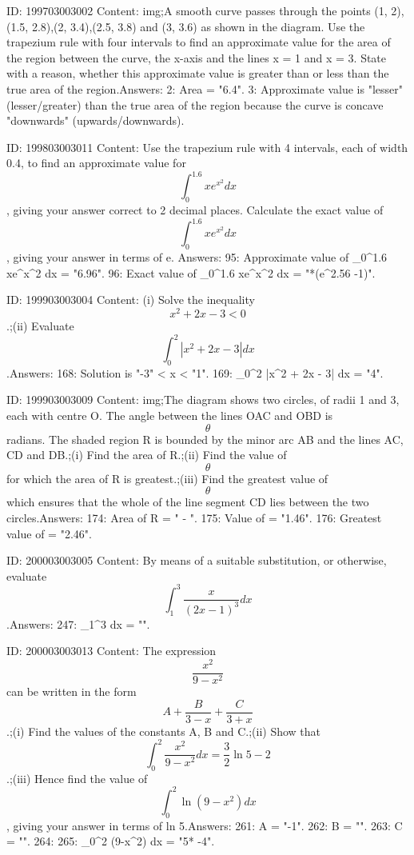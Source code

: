 \documentclass{article}
\begin{document}
ID: 199703003002
Content:
img;A smooth curve passes through the points (1, 2),(1.5, 2.8),(2, 3.4),(2.5, 3.8) and (3, 3.6) as shown in the diagram. Use the trapezium rule with four intervals to find an approximate value for the area of the region between the curve, the x-axis and the lines x = 1 and x = 3. State with a reason, whether this approximate value is greater than or less than the true area of the region.Answers:
2: Area = "6.4".
3: Approximate value is "lesser" (lesser/greater) than the true area of the region because the curve is concave "downwards" (upwards/downwards).

ID: 199803003011
Content:
Use the trapezium rule with 4 intervals, each of width 0.4, to find an approximate value for $$\int^{1.6}_0 x e^{x^2} dx$$, giving your answer correct to 2 decimal places. Calculate the exact value of $$\int^{1.6}_0 x e^{x^2} dx$$, giving your answer in terms of e. Answers:
95: Approximate value of \int_0^1.6 xe^{x^2} dx = "6.96".
96: Exact value of \int_0^1.6 xe^{x^2} dx = "*(e^{2.56} -1)".

ID: 199903003004
Content:
(i) Solve the inequality \[x^2 + 2x - 3 < 0\].;(ii) Evaluate \[\int_{0}^{2} |x^2 + 2x - 3| dx\].Answers:
168: Solution is "-3" < x < "1".
169: \int_0^2 |x^2 + 2x - 3| dx = "4".

ID: 199903003009
Content:
img;The diagram shows two circles, of radii 1 and 3, each with centre O. The angle between the lines OAC and OBD is \[\theta\] radians. The shaded region R is bounded by the minor arc AB and the lines AC, CD and DB.;(i) Find the area of R.;(ii) Find the value of \[\theta\] for which the area of R is greatest.;(iii) Find the greatest value of \[\theta\] which ensures that the whole of the line segment CD lies between the two circles.Answers:
174: Area of R = " \sin{\theta} - \theta".
175: Value of \theta = "1.46".
176: Greatest value of \theta = "2.46".

ID: 200003003005
Content:
By means of a suitable substitution, or otherwise, evaluate \[\int_{1}^{3} \frac{x}{(2x-1)^3} dx\].Answers:
247: \int_1^3  dx = "".

ID: 200003003013
Content:
The expression \[\frac{x^2}{9-x^2}\] can be written in the form \[A + \frac{B}{3 - x} + \frac{C}{3 + x}\].;(i) Find the values of the constants A, B and C.;(ii) Show that \[\int_{0}^{2} \frac{x^2}{9 - x^2} dx = \frac{3}{2}\ln 5 - 2\].;(iii) Hence find the value of \[\int_{0}^{2} \ln (9 - x^2) dx\], giving your answer in terms of ln 5.Answers:
261: A = "-1".
262: B = "".
263: C = "".
264: 
265: \int_0^2 \ln(9-x^2) dx = "5* -4".
\end{document}

